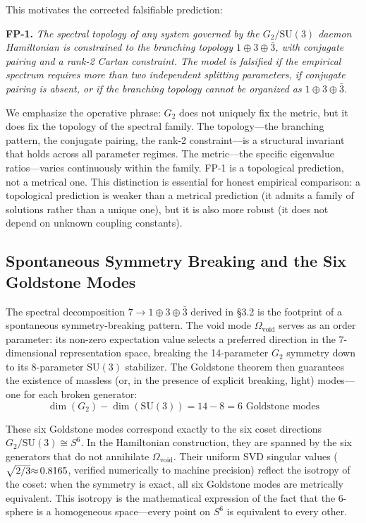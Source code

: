 \documentclass[12pt,a4paper]{article}
\begin{document}
This motivates the corrected falsifiable prediction:

\textbf{FP-1.} \textit{The spectral topology of any system governed by the $G_2/\mathrm{SU}(3)$ daemon Hamiltonian is constrained to the branching topology $1 \oplus 3 \oplus \bar{3}$, with conjugate pairing and a rank-2 Cartan constraint. The model is falsified if the empirical spectrum requires more than two independent splitting parameters, if conjugate pairing is absent, or if the branching topology cannot be organized as $1 \oplus 3 \oplus \bar{3}$.}

We emphasize the operative phrase: $G_2$ does not uniquely fix the metric, but it does fix the topology of the spectral family. The topology---the branching pattern, the conjugate pairing, the rank-2 constraint---is a structural invariant that holds across all parameter regimes. The metric---the specific eigenvalue ratios---varies continuously within the family. FP-1 is a topological prediction, not a metrical one. This distinction is essential for honest empirical comparison: a topological prediction is weaker than a metrical prediction (it admits a family of solutions rather than a unique one), but it is also more robust (it does not depend on unknown coupling constants).

\subsection{Spontaneous Symmetry Breaking and the Six Goldstone Modes}
\label{sec:goldstone}

The spectral decomposition $7 \to 1 \oplus 3 \oplus \bar{3}$ derived in \S3.2 is the footprint of a spontaneous symmetry-breaking pattern. The void mode $\Omega_{\mathrm{void}}$ serves as an order parameter: its non-zero expectation value selects a preferred direction in the 7-dimensional representation space, breaking the 14-parameter $G_2$ symmetry down to its 8-parameter $\mathrm{SU}(3)$ stabilizer. The Goldstone theorem then guarantees the existence of massless (or, in the presence of explicit breaking, light) modes---one for each broken generator:
\begin{equation}
\dim(G_2) - \dim(\mathrm{SU}(3)) = 14 - 8 = 6 \text{ Goldstone modes}
\label{eq:goldstone}
\end{equation}

These six Goldstone modes correspond exactly to the six coset directions $G_2/\mathrm{SU}(3) \cong S^6$. In the Hamiltonian construction, they are spanned by the six generators that do not annihilate $\Omega_{\mathrm{void}}$. Their uniform SVD singular values ($\smash{\sqrt{2/3}} {\approx}\, 0.8165$, verified numerically to machine precision) reflect the isotropy of the coset: when the symmetry is exact, all six Goldstone modes are metrically equivalent. This isotropy is the mathematical expression of the fact that the 6-sphere is a homogeneous space---every point on $S^6$ is equivalent to every other.
\end{document}
